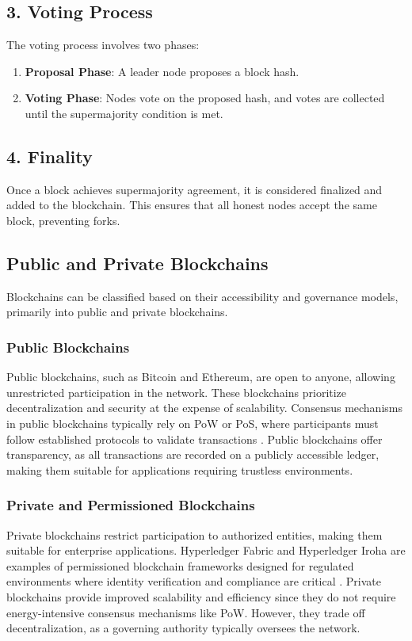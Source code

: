 \documentclass{article}
\begin{document}
\subsection*{3. Voting Process}
The voting process involves two phases:
\begin{enumerate}
    \item \textbf{Proposal Phase}: A leader node proposes a block hash.
    \item \textbf{Voting Phase}: Nodes vote on the proposed hash, and votes are collected until the supermajority condition is met.
\end{enumerate}

\subsection*{4. Finality}
Once a block achieves supermajority agreement, it is considered finalized and added to the blockchain. This ensures that all honest nodes accept the same block, preventing forks.


\subsection{Public and Private Blockchains}

Blockchains can be classified based on their accessibility and governance models, primarily into public and private blockchains.

\subsubsection{Public Blockchains}
Public blockchains, such as Bitcoin and Ethereum, are open to anyone, allowing unrestricted participation in the network. These blockchains prioritize decentralization and security at the expense of scalability. Consensus mechanisms in public blockchains typically rely on PoW or PoS, where participants must follow established protocols to validate transactions \cite{buterin2014next}. Public blockchains offer transparency, as all transactions are recorded on a publicly accessible ledger, making them suitable for applications requiring trustless environments.

\subsubsection{Private and Permissioned Blockchains}
Private blockchains restrict participation to authorized entities, making them suitable for enterprise applications. Hyperledger Fabric and Hyperledger Iroha are examples of permissioned blockchain frameworks designed for regulated environments where identity verification and compliance are critical \cite{androulaki2018hyperledger}. Private blockchains provide improved scalability and efficiency since they do not require energy-intensive consensus mechanisms like PoW. However, they trade off decentralization, as a governing authority typically oversees the network.
\end{document}
